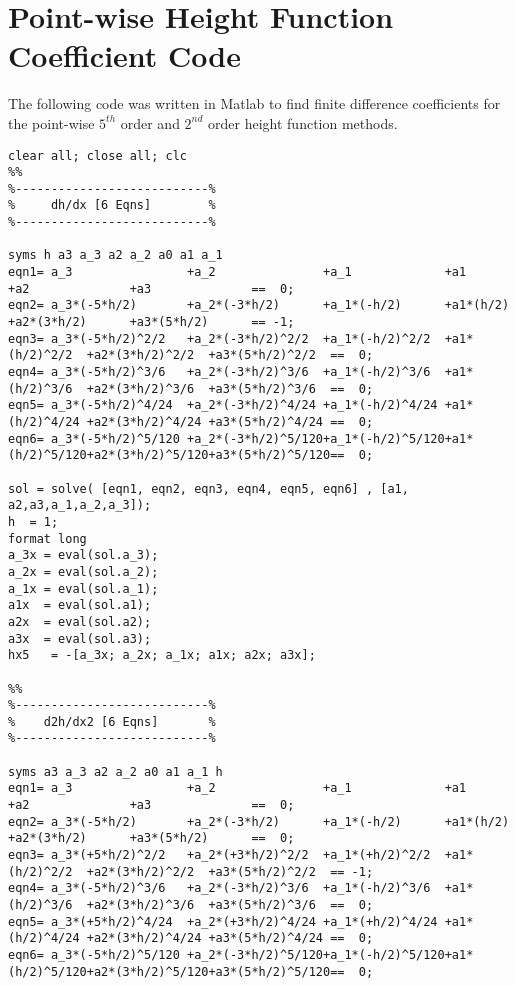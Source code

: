 \chapter{Point-wise Height Function Coefficient Code}\label{appendixa}
The following code was written in Matlab to find finite difference coefficients for the point-wise $5^{th}$ order and $2^{nd}$ order height function methods.

\begin{lstlisting}
clear all; close all; clc
%%
%---------------------------%
%     dh/dx [6 Eqns]        %
%---------------------------%

syms h a3 a_3 a2 a_2 a0 a1 a_1
eqn1= a_3                +a_2               +a_1             +a1            +a2              +a3              ==  0;
eqn2= a_3*(-5*h/2)       +a_2*(-3*h/2)      +a_1*(-h/2)      +a1*(h/2)      +a2*(3*h/2)      +a3*(5*h/2)      == -1;
eqn3= a_3*(-5*h/2)^2/2   +a_2*(-3*h/2)^2/2  +a_1*(-h/2)^2/2  +a1*(h/2)^2/2  +a2*(3*h/2)^2/2  +a3*(5*h/2)^2/2  ==  0;
eqn4= a_3*(-5*h/2)^3/6   +a_2*(-3*h/2)^3/6  +a_1*(-h/2)^3/6  +a1*(h/2)^3/6  +a2*(3*h/2)^3/6  +a3*(5*h/2)^3/6  ==  0;
eqn5= a_3*(-5*h/2)^4/24  +a_2*(-3*h/2)^4/24 +a_1*(-h/2)^4/24 +a1*(h/2)^4/24 +a2*(3*h/2)^4/24 +a3*(5*h/2)^4/24 ==  0;
eqn6= a_3*(-5*h/2)^5/120 +a_2*(-3*h/2)^5/120+a_1*(-h/2)^5/120+a1*(h/2)^5/120+a2*(3*h/2)^5/120+a3*(5*h/2)^5/120==  0;

sol = solve( [eqn1, eqn2, eqn3, eqn4, eqn5, eqn6] , [a1, a2,a3,a_1,a_2,a_3]);
h  = 1;
format long
a_3x = eval(sol.a_3);
a_2x = eval(sol.a_2);
a_1x = eval(sol.a_1);
a1x  = eval(sol.a1);
a2x  = eval(sol.a2);
a3x  = eval(sol.a3);
hx5   = -[a_3x; a_2x; a_1x; a1x; a2x; a3x];

%%
%---------------------------%
%    d2h/dx2 [6 Eqns]       %
%---------------------------%

syms a3 a_3 a2 a_2 a0 a1 a_1 h
eqn1= a_3                +a_2               +a_1             +a1            +a2              +a3              ==  0;
eqn2= a_3*(-5*h/2)       +a_2*(-3*h/2)      +a_1*(-h/2)      +a1*(h/2)      +a2*(3*h/2)      +a3*(5*h/2)      ==  0;
eqn3= a_3*(+5*h/2)^2/2   +a_2*(+3*h/2)^2/2  +a_1*(+h/2)^2/2  +a1*(h/2)^2/2  +a2*(3*h/2)^2/2  +a3*(5*h/2)^2/2  == -1;
eqn4= a_3*(-5*h/2)^3/6   +a_2*(-3*h/2)^3/6  +a_1*(-h/2)^3/6  +a1*(h/2)^3/6  +a2*(3*h/2)^3/6  +a3*(5*h/2)^3/6  ==  0;
eqn5= a_3*(+5*h/2)^4/24  +a_2*(+3*h/2)^4/24 +a_1*(+h/2)^4/24 +a1*(h/2)^4/24 +a2*(3*h/2)^4/24 +a3*(5*h/2)^4/24 ==  0;
eqn6= a_3*(-5*h/2)^5/120 +a_2*(-3*h/2)^5/120+a_1*(-h/2)^5/120+a1*(h/2)^5/120+a2*(3*h/2)^5/120+a3*(5*h/2)^5/120==  0;


\end{lstlisting}
